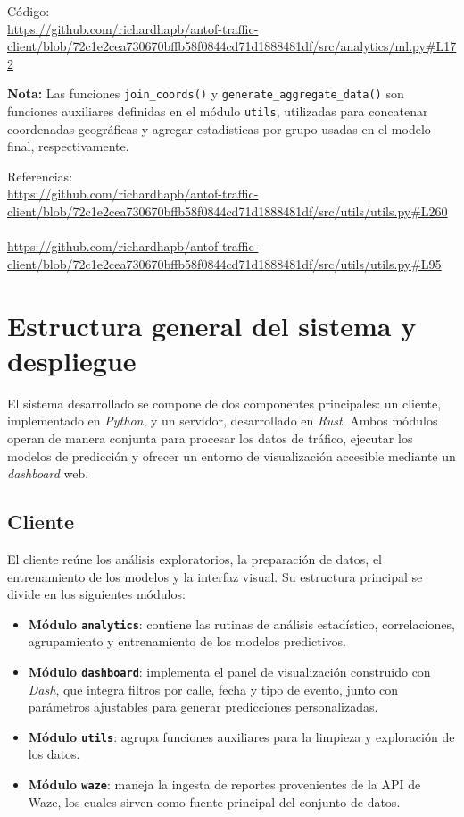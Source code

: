 \documentclass[12pt]{article}
\begin{document}
Código: \\
\url{https://github.com/richardhapb/antof-traffic-client/blob/72c1e2cea730670bffb58f0844cd71d1888481df/src/analytics/ml.py#L172}

\noindent\textbf{Nota:}
Las funciones \texttt{join\_coords()} y \texttt{generate\_aggregate\_data()} son funciones auxiliares definidas en el módulo \texttt{utils}, utilizadas para concatenar coordenadas geográficas y agregar estadísticas por grupo usadas en el modelo final, respectivamente.

Referencias: \\
\url{https://github.com/richardhapb/antof-traffic-client/blob/72c1e2cea730670bffb58f0844cd71d1888481df/src/utils/utils.py#L260} \\\\
\url{https://github.com/richardhapb/antof-traffic-client/blob/72c1e2cea730670bffb58f0844cd71d1888481df/src/utils/utils.py#L95}

\newpage

\section{Estructura general del sistema y despliegue}
\label{annex:dashboard}

El sistema desarrollado se compone de dos componentes principales: un cliente, implementado en \textit{Python}, y un servidor, desarrollado en \textit{Rust}.
Ambos módulos operan de manera conjunta para procesar los datos de tráfico, ejecutar los modelos de predicción y ofrecer un entorno de visualización accesible mediante un \textit{dashboard} web.

\subsection*{Cliente}

El cliente reúne los análisis exploratorios, la preparación de datos, el entrenamiento de los modelos y la interfaz visual.
Su estructura principal se divide en los siguientes módulos:

\begin{itemize}
    \item \textbf{Módulo \texttt{analytics}}: contiene las rutinas de análisis estadístico, correlaciones, agrupamiento y entrenamiento de los modelos predictivos.
    \item \textbf{Módulo \texttt{dashboard}}: implementa el panel de visualización construido con \textit{Dash}, que integra filtros por calle, fecha y tipo de evento, junto con parámetros ajustables para generar predicciones personalizadas.
    \item \textbf{Módulo \texttt{utils}}: agrupa funciones auxiliares para la limpieza y exploración de los datos.
    \item \textbf{Módulo \texttt{waze}}: maneja la ingesta de reportes provenientes de la API de Waze, los cuales sirven como fuente principal del conjunto de datos.
\end{itemize}
\end{document}
